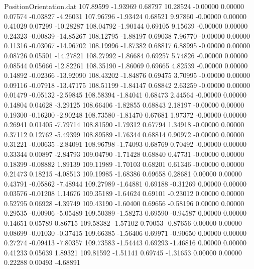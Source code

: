 \begin{filecontents}{PositionOrientation.dat}
 107.89599   -1.93969    0.68797    10.28524   -0.00000    0.00000    0.07574   -0.03827   -4.26031
 107.96796   -1.93424    0.68521     9.97860   -0.00000    0.00000    0.41029    0.07299  -10.28287
 108.04792   -1.90144    0.69105     9.15639   -0.00000    0.00000    0.24323   -0.00839  -14.85267
 108.12795   -1.88197    0.69038     7.96770   -0.00000    0.00000    0.11316   -0.03067  -14.96702
 108.19996   -1.87382    0.68817     6.88995   -0.00000    0.00000    0.08726    0.05501  -14.27821
 108.27992   -1.86684    0.69257     5.74826   -0.00000    0.00000    0.08544    0.05666  -12.82261
 108.35190   -1.86069    0.69665     4.82539   -0.00000    0.00000    0.14892   -0.02366  -13.92090
 108.43202   -1.84876    0.69475     3.70995   -0.00000    0.00000    0.09116   -0.07918  -13.47175
 108.51199   -1.84147    0.68842     2.63259   -0.00000    0.00000    0.01479   -0.05132   -2.59845
 108.58394   -1.84041    0.68473     2.44564   -0.00000    0.00000    0.14804    0.04628   -3.29125
 108.66406   -1.82855    0.68843     2.18197   -0.00000    0.00000    0.19300   -0.16200   -2.90248
 108.73580   -1.81470    0.67681     1.97372   -0.00000    0.00000    0.26941    0.01405   -7.79714
 108.81590   -1.79312    0.67794     1.34918   -0.00000    0.00000    0.37112    0.12762   -5.49399
 108.89589   -1.76344    0.68814     0.90972   -0.00000    0.00000    0.31221   -0.00635   -2.84091
 108.96798   -1.74093    0.68769     0.70492   -0.00000    0.00000    0.33344    0.00897   -2.84793
 109.04790   -1.71428    0.68840     0.47731   -0.00000    0.00000    0.18399   -0.08882    1.89139
 109.11989   -1.70103    0.68201     0.61346   -0.00000    0.00000    0.21473    0.18215   -4.08513
 109.19985   -1.68386    0.69658     0.28681    0.00000    0.00000    0.43791   -0.05862   -7.48944
 109.27989   -1.64881    0.69188    -0.31269    0.00000    0.00000    0.03576   -0.01208    1.14676
 109.35189   -1.64624    0.69101    -0.23012    0.00000    0.00000    0.52795    0.06928   -4.39749
 109.43190   -1.60400    0.69656    -0.58196    0.00000    0.00000    0.29535   -0.00906   -5.05489
 109.50389   -1.58273    0.69590    -0.94587    0.00000    0.00000    0.14651    0.05789    0.86715
 109.58382   -1.57102    0.70053    -0.87656    0.00000    0.00000    0.08699   -0.01030   -0.37415
 109.66385   -1.56406    0.69971    -0.90650    0.00000    0.00000    0.27274   -0.09413   -7.80357
 109.73583   -1.54443    0.69293    -1.46816    0.00000    0.00000    0.41233    0.05639    1.89321
 109.81592   -1.51141    0.69745    -1.31653    0.00000    0.00000    0.22288    0.00493   -4.68891

\end{filecontents}
